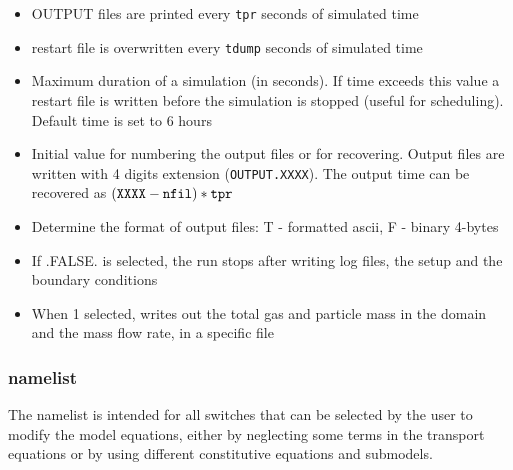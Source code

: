 \begin{itemize}
\item
{}
{OUTPUT files are printed every {\tt tpr} seconds of simulated time}

\item
{}
{restart file is overwritten every {\tt tdump} seconds of simulated time}

\item
{}
{Maximum duration of a simulation (in seconds). If time exceeds this value
a restart file is written before the simulation is stopped (useful for
scheduling). Default time is set to 6 hours}

\item
{}
{Initial value for numbering the output files or for recovering.
Output files are written with 4 digits extension ({\tt OUTPUT.XXXX}). 
The output time can be recovered as $({\tt XXXX - nfil})* {\tt tpr}$ }

\item
{}
{Determine the format of output files: T - formatted ascii, 
F - binary 4-bytes }

\item
{}
{If .FALSE. is selected, the run stops after writing log files, the setup and the boundary conditions}

\item
{}
{ When 1 selected, writes out the total gas and particle mass in the domain
and the mass flow rate, in a specific file }
\end{itemize}

\subsubsection{ namelist}
The  namelist is intended for all switches that can be selected
by the user to modify the model equations, either by neglecting some terms
in the transport equations or by using different constitutive equations
and submodels.

